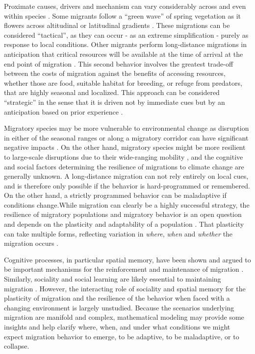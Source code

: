 \documentclass[utf8]{frontiersSCNS} %
\begin{document}
	Proximate causes, drivers and mechanism can vary considerably across and even within species \citep{Berthold1999, Shaw2016}. Some migrants follow a ``green wave'' of spring vegetation as it flowers across altitudinal or latitudinal gradients \citep{Bischof2012, Kolzsch2015, Merkle2016}. These migrations can be considered ``tactical'', as they can occur - as an extreme simplification - purely as response to local conditions. Other migrants perform long-distance migrations in anticipation that critical resources will be available at the time of arrival at the end point of migration \citep{Abrahms2019}. This second behavior involves the greatest trade-off between the costs of migration against the benefits of accessing resources, whether those are food, suitable habitat for breeding, or refuge from predators, that are highly seasonal and localized. This approach can be considered ``strategic'' in the sense that it is driven not by immediate cues but by an anticipation based on prior experience \citep{Bracis2017, Merkle2019, Bauer2020}. 

	Migratory species may be more vulnerable to environmental change as disruption in either of the seasonal ranges or along a migratory corridor can have significant negative impacts \citep{Wilcove2008, Seebacher2015, Kauffman2021}. On the other hand, migratory species might be more resilient to large-scale disruptions due to their wide-ranging mobility \citep{Robinson2009}, and the cognitive and social factors determining the resilience of migrations to climate change are generally unknown. A long-distance migration can not rely entirely on local cues, and is therefore only possible if the behavior is hard-programmed or remembered. On the other hand, a strictly programmed behavior can be maladaptive if conditions change.While migration can clearly be a highly successful strategy, the resilience of migratory populations and migratory behavior is an open question and depends on the plasticity and adaptability of a population \citep{Xu2021}.  That plasticity can take multiple forms, reflecting variation in \textit{where}, \textit{when} and \textit{whether} the migration occurs \citet{Gurarie2017, Xu2021}. 
	
	Cognitive processes, in particular spatial memory, have been shown and argued to be important mechanisms for the reinforcement and maintenance of migration \citep{Merkle2019, Bauer2020}. Similarly, sociality and social learning are likely essential to maintaining migration \citep{Guttal2020,Fagan2011,Jesmer2018,Berdahl2018}.  However, the interacting role of sociality and spatial memory for the plasticity of migration and the resilience of the behavior when faced with a changing environment is largely unstudied.  Because the scenarios underlying migration are manifold and complex, mathematical modeling may provide some insights and help clarify where, when, and under what conditions we might expect migration behavior to emerge, to be adaptive, to be maladaptive, or to collapse.
		
\end{document}
